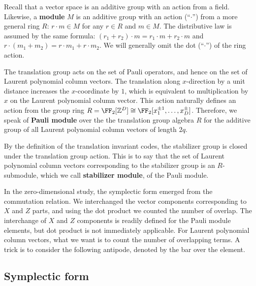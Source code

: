 Recall that a vector space is an additive group with an action from a field.
Likewise, a {\bf module} $M$ is an additive group with an action (``$\cdot$'') 
from a more general ring $R$:
$r \cdot m \in M$ for any $r \in R$ and $m \in M$.
The distributive law is assumed by the same formula:
$(r_1 + r_2) \cdot m = r_1 \cdot m + r_2 \cdot m$
and
$r \cdot ( m_1 + m_2 ) = r \cdot m_1 + r \cdot m_2$.
We will generally omit the dot (``$\cdot$'') of the ring action.

The translation group acts on the set of Pauli operators,
and hence on the set of Laurent polynomial column vectors.
The translation along $x$-direction by a unit distance increases the $x$-coordinate by $1$,
which is equivalent to multiplication by $x$ on the Laurent polynomial column vector.
This action naturally defines an action from the group ring
$R = \FF_2[ \mathbb Z^D] \cong \FF_2[ x_1 ^{\pm 1} , \ldots, x_D^{\pm}]$.
Therefore, we speak of {\bf Pauli module} over the the translation group algebra $R$
for the additive group of all Laurent polynomial column vectors of length $2q$.

By the definition of the translation invariant codes,
the stabilizer group is closed under the translation group action.
This is to say that the set of Laurent polynomial column vectors corresponding
to the stabilizer group
is an $R$-submodule, which we call {\bf stabilizer module}, of the Pauli module.

In the zero-dimensional study, the symplectic form emerged from the commutation relation.
We interchanged the vector components corresponding to $X$ and $Z$ parts,
and using the dot product we counted the number of overlap.
The interchange of $X$ and $Z$ components is readily defined
for the Pauli module elements,
but dot product is not immediately applicable.
For Laurent polynomial column vectors, what we want is
to count the number of overlapping terms.
A trick is to consider the following antipode, denoted by the bar over the element.


\subsection{Symplectic form}


